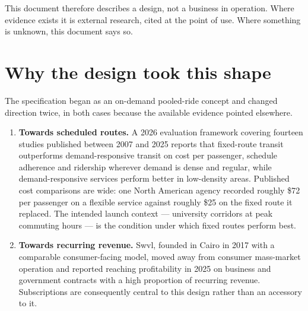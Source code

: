 \vspace{4pt}
This document therefore describes a design, not a business in operation. Where evidence exists it is
external research, cited at the point of use. Where something is unknown, this document says so.

\section{Why the design took this shape}

The specification began as an on-demand pooled-ride concept and changed direction twice, in both
cases because the available evidence pointed elsewhere.

\begin{enumerate}[label=\textbf{\arabic*.}]
\item \textbf{Towards scheduled routes.} A 2026 evaluation framework covering fourteen studies
      published between 2007 and 2025 reports that fixed-route transit outperforms
      demand-responsive transit on cost per passenger, schedule adherence and ridership wherever
      demand is dense and regular, while demand-responsive services perform better in low-density
      areas. Published cost comparisons are wide: one North American agency recorded roughly
      \$72 per passenger on a flexible service against roughly \$25 on the fixed route it replaced.
      The intended launch context --- university corridors at peak commuting hours --- is the
      condition under which fixed routes perform best.
\item \textbf{Towards recurring revenue.} Swvl, founded in Cairo in 2017 with a comparable
      consumer-facing model, moved away from consumer mass-market operation and reported reaching
      profitability in 2025 on business and government contracts with a high proportion of
      recurring revenue. Subscriptions are consequently central to this design rather than an
      accessory to it.
\end{enumerate}

